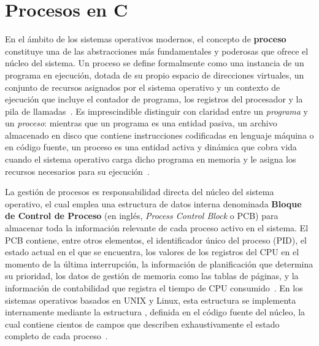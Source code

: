 %
%
\section{Procesos en C}
\label{sec:procesos}




En el ámbito de los sistemas operativos modernos, el concepto de \textbf{proceso} constituye una de las abstracciones más fundamentales y poderosas que ofrece el núcleo del sistema. Un proceso se define formalmente como una instancia de un programa en ejecución, dotada de su propio espacio de direcciones virtuales, un conjunto de recursos asignados por el sistema operativo y un contexto de ejecución que incluye el contador de programa, los registros del procesador y la pila de llamadas~\cite{silberschatz2018}. Es imprescindible distinguir con claridad entre un \textit{programa} y un \textit{proceso}: mientras que un programa es una entidad pasiva, un archivo almacenado en disco que contiene instrucciones codificadas en lenguaje máquina o en código fuente, un proceso es una entidad activa y dinámica que cobra vida cuando el sistema operativo carga dicho programa en memoria y le asigna los recursos necesarios para su ejecución~\cite{tanenbaum2015}.

La gestión de procesos es responsabilidad directa del núcleo del sistema operativo, el cual emplea una estructura de datos interna denominada \textbf{Bloque de Control de Proceso} (en inglés, \textit{Process Control Block} o PCB) para almacenar toda la información relevante de cada proceso activo en el sistema. El PCB contiene, entre otros elementos, el identificador único del proceso (PID), el estado actual en el que se encuentra, los valores de los registros del CPU en el momento de la última interrupción, la información de planificación que determina su prioridad, los datos de gestión de memoria como las tablas de páginas, y la información de contabilidad que registra el tiempo de CPU consumido~\cite{silberschatz2018}. En los sistemas operativos basados en UNIX y Linux, esta estructura se implementa internamente mediante la estructura , definida en el código fuente del núcleo, la cual contiene cientos de campos que describen exhaustivamente el estado completo de cada proceso~\cite{love2013}.

